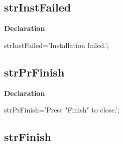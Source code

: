 \documentclass{report}
\newif\ifpdf
\begin{document}
\subsection*{strInstFailed}
\fi
\label{trstrings-strInstFailed}
\begin{list}{}{
\setlength{\itemindent}{0cm}
\setlength{\listparindent}{0cm}
\setlength{\leftmargin}{\evensidemargin}
\addtolength{\leftmargin}{\tmplength}
\settowidth{\labelsep}{X}
\addtolength{\leftmargin}{\labelsep}
\setlength{\labelwidth}{\tmplength}
}
\item[\textbf{Declaration}\hfill]
\ifpdf
\begin{flushleft}
\fi
\begin{ttfamily}
strInstFailed='Installation failed.';\end{ttfamily}

\ifpdf
\end{flushleft}
\fi

\end{list}
\ifpdf
\subsection*{\large{\textbf{strPrFinish}}\normalsize\hspace{1ex}\hrulefill}
\else
\subsection*{strPrFinish}
\fi
\label{trstrings-strPrFinish}
\begin{list}{}{
\setlength{\itemindent}{0cm}
\setlength{\listparindent}{0cm}
\setlength{\leftmargin}{\evensidemargin}
\addtolength{\leftmargin}{\tmplength}
\settowidth{\labelsep}{X}
\addtolength{\leftmargin}{\labelsep}
\setlength{\labelwidth}{\tmplength}
}
\item[\textbf{Declaration}\hfill]
\ifpdf
\begin{flushleft}
\fi
\begin{ttfamily}
strPrFinish='Press "Finish" to close.';\end{ttfamily}

\ifpdf
\end{flushleft}
\fi

\end{list}
\ifpdf
\subsection*{\large{\textbf{strFinish}}\normalsize\hspace{1ex}\hrulefill}
\else
\end{document}
